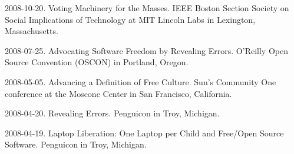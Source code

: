 \documentclass[10pt]{article}
\newenvironment{cvlist}{
\begin{list}{}{\leftmargin=3.0em \itemindent=-3.0em}
  \setlength{\itemsep}{0pt}
  \setlength{\parskip}{0em}
  \setlength{\parsep}{1em}
  \setlength{\parindent}{0em}}
{\vspace{1em}
\end{list}}
\begin{document}
\begin{cvlist}
\item 2008-10-20. Voting Machinery for the Masses. IEEE Boston Section Society on Social Implications of Technology at MIT Lincoln Labs in Lexington, Massachusetts.
\item 2008-07-25. Advocating Software Freedom by Revealing Errors. O'Reilly Open Source Convention (OSCON) in Portland, Oregon. %
\item 2008-05-05. Advancing a Definition of Free Culture. Sun's Community One conference at the Moscone Center in San Francisco, California.
\item 2008-04-20. Revealing Errors. Penguicon in Troy, Michigan. %
\item 2008-04-19. Laptop Liberation: One Laptop per Child and Free/Open Source Software. Penguicon in Troy, Michigan. %

\end{cvlist}
\end{document}

